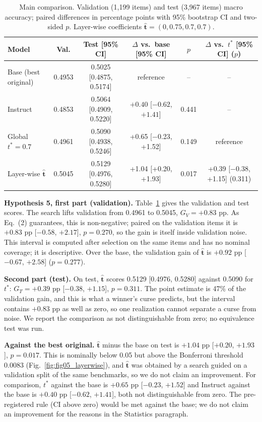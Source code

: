 \documentclass[conference]{IEEEtran}
\begin{document}
\begin{table}[!t]
\caption{Main comparison. Validation (1{,}199 items) and test (3{,}967 items) macro accuracy; paired differences in percentage points with 95\% bootstrap CI and two-sided $p$. Layer-wise coefficients $\hat{\mathbf t}=(0,0.75,0.7,0.7)$.}
\label{tab:main}
\centering\small
\begin{tabular}{lccccc}
\toprule
Model & Val. & Test [95\% CI] & $\Delta$ vs.\ base [95\% CI] & $p$ & $\Delta$ vs.\ $t^*$ [95\% CI] ($p$) \\
\midrule
Base (best original) & 0.4953 & 0.5025 [0.4875, 0.5174] & reference & -- & -- \\
Instruct & 0.4853 & 0.5064 [0.4909, 0.5220] & $+0.40$ [$-0.62$, $+1.41$] & 0.441 & -- \\
Global $t^*=0.7$ & 0.4961 & 0.5090 [0.4938, 0.5246] & +0.65 [$-$0.23, +1.52] & 0.149 & reference \\
Layer-wise $\hat{\mathbf t}$ & 0.5045 & 0.5129 [0.4976, 0.5280] & +1.04 [+0.20, +1.93] & 0.017 & +0.39 [$-$0.38, +1.15] (0.311) \\
\bottomrule
\end{tabular}
\end{table}

\textbf{Hypothesis 5, first part (validation).} Table~\ref{tab:main} gives the validation and test scores. The search lifts validation from 0.4961 to 0.5045, $G_V=+0.83$ pp. As Eq.~(2) guarantees, this is non-negative; paired on the validation items it is $+0.83$ pp [$-0.58$, $+2.17$], $p=0.270$, so the gain is itself inside validation noise. This interval is computed after selection on the same items and has no nominal coverage; it is descriptive. Over the base, the validation gain of $\hat{\mathbf t}$ is $+0.92$ pp [$-0.67$, $+2.58$] ($p=0.277$).

\textbf{Second part (test).} On test, $\hat{\mathbf t}$ scores 0.5129 [0.4976, 0.5280] against 0.5090 for $t^*$: $G_T=+0.39$ pp [$-0.38$, $+1.15$], $p=0.311$. The point estimate is 47\% of the validation gain, and this is what a winner's curse predicts, but the interval contains $+0.83$ pp as well as zero, so one realization cannot separate a curse from noise. We report the comparison as not distinguishable from zero; no equivalence test was run.

\textbf{Against the best original.} $\hat{\mathbf t}$ minus the base on test is $+1.04$ pp [$+0.20$, $+1.93$], $p=0.017$. This is nominally below 0.05 but above the Bonferroni threshold 0.0083 (Fig.~\ref{fig:fig05_layerwise}), and $\hat{\mathbf t}$ was obtained by a search guided on a validation split of the same benchmarks, so we do not claim an improvement. For comparison, $t^*$ against the base is $+0.65$ pp [$-0.23$, $+1.52$] and Instruct against the base is $+0.40$ pp [$-0.62$, $+1.41$], both not distinguishable from zero. The pre-registered rule (CI above zero) would be met against the base; we do not claim an improvement for the reasons in the Statistics paragraph.
\end{document}
